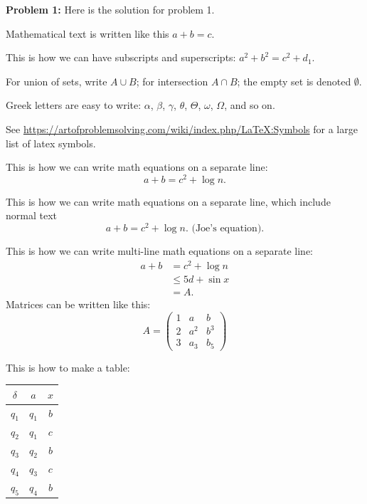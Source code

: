 \documentclass[12pt,letterpaper,final]{report}
\begin{document}
\vline


\noindent\textbf{Problem 1:}  Here is the solution for problem 1.

Mathematical text is written like this $a+b = c$.

This is how we can have subscripts and superscripts: $a^2 + b^2 = c^2 + d_1$.

For union of sets, write $A \cup B$; for intersection $A \cap B$; the empty set is denoted $\emptyset$.

Greek letters are easy to write: $\alpha$, $\beta$, $\gamma$, $\theta$, $\Theta$, $\omega$, $\Omega$, and so on.

See \url{https://artofproblemsolving.com/wiki/index.php/LaTeX:Symbols} for a large list of latex symbols.

This is how we can write math equations on a separate line:
\[
  a+b = c^2 + \log n.
\]

This is how we can write math equations on a separate line, which include normal text
\[
  a+b = c^2 + \log n. \mbox{    (Joe's equation).}
\]

This is how we can write multi-line math equations on a separate line:
\[
  \begin{array}{ll}
    a+b & = c^2 + \log n   \\
        & \leq 5d + \sin x \\
        & = A.
  \end{array}
\]
Matrices can be written like this:
\[
  A =
  \begin{pmatrix}
    1 & a   & b   \\
    2 & a^2 & b^3 \\
    3 & a_3 & b_5
  \end{pmatrix}
\]
\bigskip

This is how to make a table:

\medskip

\begin{tabular}{|c|c|c|}
  \hline
  $\delta$ & $a$     & $x$  \\
  \hline
  $q_{1}$  & $q_{1}$ & $ b$ \\
  $q_{2}$  & $q_{1}$ & $ c$ \\
  $q_{3}$  & $q_{2}$ & $ b$ \\
  $q_{4}$  & $q_{3}$ & $ c$ \\
  $q_{5}$  & $q_{4}$ & $ b$ \\
  \hline
\end{tabular}
\medskip
\end{document}
